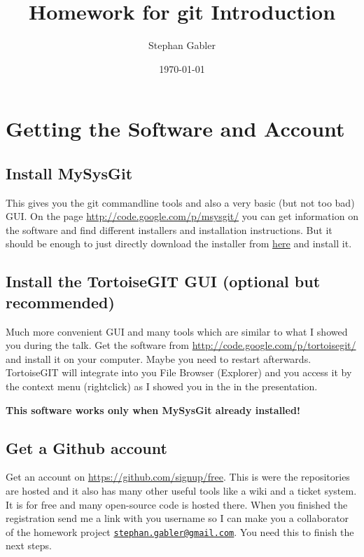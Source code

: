 \documentclass[]{article}
\title{Homework for git Introduction}
\author{Stephan Gabler}
\date{\today}
\begin{document}
\ifpdf
{}
\else
{}
\fi

\maketitle


\section{Getting the Software and Account}

\subsection{Install MySysGit} %
\label{sg:sub:install_mysysgit}
This gives you the git commandline tools and also a very basic (but not too bad) GUI. On the page \url{http://code.google.com/p/msysgit/} you can get information on the software and find different installers and installation instructions. But it should be enough to just directly download the installer from \href{http://code.google.com/p/msysgit/downloads/detail?name=Git-1.7.3.1-preview20101002.exe}{here} and install it.



\subsection{Install the TortoiseGIT GUI (optional but recommended)} %
\label{sg:sub:install_the_tortoisegit_gui_optional_}
Much more convenient GUI and many tools which are similar to what I showed you during the talk. Get the software from \url{http://code.google.com/p/tortoisegit/} and install it on your computer. Maybe you need to restart afterwards. TortoiseGIT will integrate into you File Browser (Explorer) and you access it by the context menu (rightclick) as I showed you in the in the presentation.

\textbf{This software works only when MySysGit already installed!}


\subsection{Get a Github account} %
\label{sg:sub:get_a_github_account}

Get an account on \url{https://github.com/signup/free}. This is were the repositories are hosted and it also has many other useful tools like a wiki and a ticket system. It is for free and many open-source code is hosted there. When you finished the registration send me a link with you username so I can make you a collaborator of the homework project \href{mailto:stephan.gabler@gmail.com}{\nolinkurl{stephan.gabler@gmail.com}}. You need this to finish the next steps.
\end{document}
